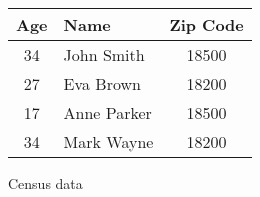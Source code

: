 \begin{figure}[H]
    \centering
    \begin{tabular}{c l c}
        \toprule
        \textbf{Age} & \textbf{Name} & \textbf{Zip Code} \\
        \midrule
        34 & John Smith  & 18500 \\
        27 & Eva Brown   & 18200 \\
        17 & Anne Parker & 18500 \\
        34 & Mark Wayne  & 18200 \\
        \bottomrule
    \end{tabular}
    \caption{Census data}\label{fig:census-data}
\end{figure}
